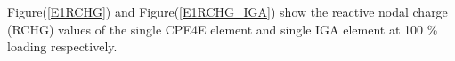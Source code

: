 \documentclass[12pt]{article}
\begin{document}

Figure(\ref{E1RCHG}) and Figure(\ref{E1RCHG_IGA}) show the reactive nodal charge (RCHG) values of the single CPE4E element and single IGA element at 100 \% loading respectively. \\
\end{document}
